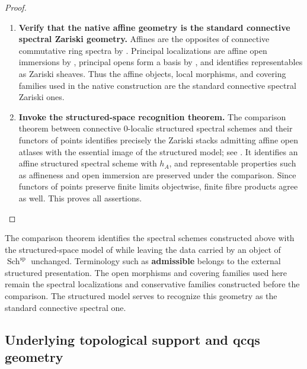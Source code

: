 \begin{proof}
\leavevmode
\begin{enumerate}[label=\textup{(\arabic*)}]
    \item \textbf{Verify that the native affine geometry is the standard
    connective spectral Zariski geometry.}
    Affines are the opposites of connective commutative ring spectra by
    . Principal localizations are affine open
    immersions by , principal opens form a
    basis by , and
     identifies representables as
    Zariski sheaves. Thus the affine objects, local morphisms, and covering
    families used in the native construction are the standard connective
    spectral Zariski ones.

    \item \textbf{Invoke the structured-space recognition theorem.}
    The comparison theorem between connective \(0\)-localic structured
    spectral schemes and their functors of points identifies precisely the
    Zariski stacks admitting affine open atlases with the essential image of
    the structured model; see
    \cite{LurieSAG,KhanBraveNewMotivicI}. It identifies an affine structured
    spectral scheme with \(h_A\), and representable properties such as
    affineness and open immersion are preserved under the comparison. Since
    functors of points preserve finite limits objectwise, finite fibre products
    agree as well. This proves all assertions.
\end{enumerate}
\end{proof}

\begin{remark}
\label{rem:no-hidden-admissibility-spectral-zariski}
The comparison theorem identifies the spectral schemes constructed above with
the structured-space model of \cite{LurieSAG} while leaving the data carried by
an object of \(\operatorname{Sch}^{\mathrm{sp}}\) unchanged. Terminology such
as \textbf{admissible} belongs to the external structured presentation. The
open morphisms and covering families used here remain the spectral localizations
and conservative families constructed before the comparison. The structured
model serves to recognize this geometry as the standard connective spectral
one.
\end{remark}

\subsection{Underlying topological support and qcqs geometry}

